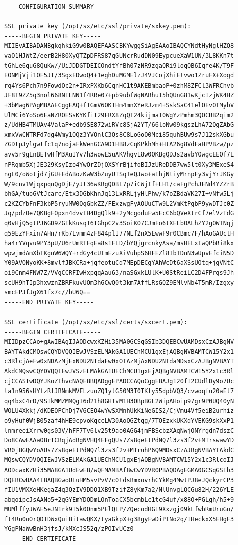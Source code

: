 \begin{lstlisting}
--- CONFIGURATION SUMMARY ---

SSL private key (/opt/sx/etc/ssl/private/sxkey.pem):
-----BEGIN PRIVATE KEY-----
MIIEvAIBADANBgkqhkiG9w0BAQEFAASCBKYwggSiAgEAAoIBAQCYNdtHyNglHZQ8
vaO1HJWtZ/eerB2H80XyQTZpDFRS87qGUNcrRudDN09EypcueXaW1UN/3L8KKn7t
tGhLe6quG8QuKw//UiJDDGTDEICOndtYfBh07zNR9zgaQRi9loqQB6Iqfe4K/T9F
EONMjVji1OF5JI/3SgxEDwoQ4+1eghDuMGMElzJ4VJCojXhiEtvwo1ZruFX+Xogd
rq4Ys6Pch7n9FowdOc2n+IRxPXKb6CqnHC1t9AKEBmbaoP+0zhM8ZFCl3WFRChvb
JF8T9ZZ5q3nol668NILNN1f4RRe07+pb9ubfWqNABhuI5hQUnG81wKjcIzjWK4HZ
+3bMwg6PAgMBAAECggEAQ+fTGmV6OKTHm4mnXYeRJzm4+SskSaC41elOEvOTMybV
UlMCi6YoSo6EaNZROESsKYKfiI29FRX8ZqQT24kijmaI0WgYzPmhm3QOCBB2qim2
z/UdHB4TMUAv4ValaP+edb9SE872wiRVc8SjA2YT/66loNw09kgszLhA72QgZAbG
xmxVwCNTRFd7dg4Wmy1OQz3YVOnlC3Qs8C8LoGoO0Mci85quhBUw9s7J12skXGbu
ZGDtpJylgwtfc1q7nojaFkWenGCA9D1HB8zCqKPkhMh+HtA26g8VdFaHPVBzw/pz
avv5r9gLnBETwHfM3XuIYv7h3wowE5uAKVhgvL8w0QKBgQDJs2avbYOwgcEEOf7L
nPRqmb5XjJE329KsyIzo4YwOrZDjQXSYrBjifoBIJzUReDDB7ww5lt0Xy3MExeS4
ngL0/oWotjd7jGU+EdABozKwW3bZuyUTSqTeQJwo+aIhjNtiyMrnpFy3vjYrJKGy
W/9cnv1WjqxpqnQgDjE/yJt36wKBgQDBL7p7iCWjIf+LH1/caFgPchJENd4YZZrB
bhGA/tuo6VtJcarc/Etx3DGbKhnJq13LxRRLjyHlPhw/k7oZBdaVK27I+vNfw5Lj
c2KZCYbFnF3kbP5ryuMW0QqGbkZZ/FExzwgFyAOUuCTw9L2VmKtPgbP9ywDTJc0Z
Jq/pdzOe7QKBgFOpxn4dvvIH4DgQlk9+2yMcgoduFw5EcC6bQVeXtrCf7elVzTdG
q0vHjQ5gtPJ6GD9ZGIkKusqT6TGhpC2v3SoiKO7CJmFo6tXELbOALhZY2gOWTNqj
q59EzYFxin7AHn/rKb7Lvmm4zF844plI77NLf2nX5EwwF9r0CBmc7F/hAoGAUctH
ha4rYVqvu9PY3pU/U6rUmRTFqEa8s1FLD/bYQjgrcnkyAsa/msHELxIwQPbRi8kx
wpwjmdAmXbTKgnW6WQY+rdGy4cUImEzuXiVubpS6HFEZl8IbTDnN3wUpvEfciN5D
Y09AVONyoKK+8mvlfJBKCRa+jqfeotuCd7MEpDECgYAhWcDt6aXSsUOtq+jgVNtC
oi9Cnm4FNW7Z/VVgCCRFIwHxpqqAau63/naSGxkLUlK+U0StReiLC2D4FPrqs9Jh
scUH9hTIp3hxwznZBRFkuvUOm3h6CwQ0t3km7AffLRsGQZ9EMlvNb4T5mR/Izgxy
smcEPJfJgX61fx7c//bU6Q==
-----END PRIVATE KEY-----

SSL certificate (/opt/sx/etc/ssl/certs/sxcert.pem):
-----BEGIN CERTIFICATE-----
MIIDpzCCAo+gAwIBAgIJAODcwxKZHi35MA0GCSqGSIb3DQEBCwUAMDsxCzAJBgNV
BAYTAkdCMQswCQYDVQQIEwJVSzELMAkGA1UEChMCU1gxEjAQBgNVBAMTCW15Y2x1
c3RlcjAeFw0xNDAzMjExNDU2NTdaFw0xOTAzMjAxNDU2NTdaMDsxCzAJBgNVBAYT
AkdCMQswCQYDVQQIEwJVSzELMAkGA1UEChMCU1gxEjAQBgNVBAMTCW15Y2x1c3Rl
cjCCASIwDQYJKoZIhvcNAQEBBQADggEPADCCAQoCggEBAJg120fI2CUdlDy9o7Uc
la1n956sHYfzRfJBNmkMVFLzuoZQ1ytG50M3T0TKly55dpbVQ3/cvwoqfu20aEt7
qq4bxC4rD/9SIkMMZMMQgI6d21h8GHTvM1H3OBpBGL2WipAHoip97gr9P0UQ40yN
WOLU4Xkkj/dKDEQPChDj7V6CEO4wYwSXMnhUkKiNeGIS2/CjVmu4Vf5eiB2urhiz
o9yHuf0WjB05zaf4hHE9cpvoKqccLW30AoQGZtqg/7TOEzxkUKXdYVEKG9skXxP1
lnmreeiXrrw0gs03V/hFF7Tv6lv25t9ao0AGG4jmFBScbzXAqNwjONYrgdn7dszC
Do8CAwEAAaOBrTCBqjAdBgNVHQ4EFgQUs7Zs8qeEtPdNQ7l3zs3f2v+MTrswawYD
VR0jBGQwYoAUs7Zs8qeEtPdNQ7l3zs3f2v+MTruhP6Q9MDsxCzAJBgNVBAYTAkdC
MQswCQYDVQQIEwJVSzELMAkGA1UEChMCU1gxEjAQBgNVBAMTCW15Y2x1c3RlcoIJ
AODcwxKZHi35MA8GA1UdEwEB/wQFMAMBAf8wCwYDVR0PBAQDAgEGMA0GCSqGSIb3
DQEBCwUAA4IBAQBGwoULuHM5svPvV7c0tdsBmxovrhCYkMg4MwtPJ8eJQckyrCP3
fIU1VMXXeHKegaZ4q3QzIV9DDO1XB9TzifZ8yKm7a2/NlUnvgLQCGu82H/226YLE
abqoipcJsAANo5+2qGYEmYDODmLOnToaCX5bcmbLc1tcG4uf/x88O+PGLgh/h5+9
MUMlffyJWAE5eJN1rk9T5k0Onm5PElQLP/ZQecodHGL9Xxzgj09kLfwbRmUruGu/
ft4Ru0oOrQDIDWxQuiBitawQKX/tyaGkpX+g38gyFwDiPINo2q/IHeckxX5EHgF3
YGgPNaWwBnH3jfsJ/kMXcJS52q/zPOIvUCz0
-----END CERTIFICATE-----


\end{lstlisting}

